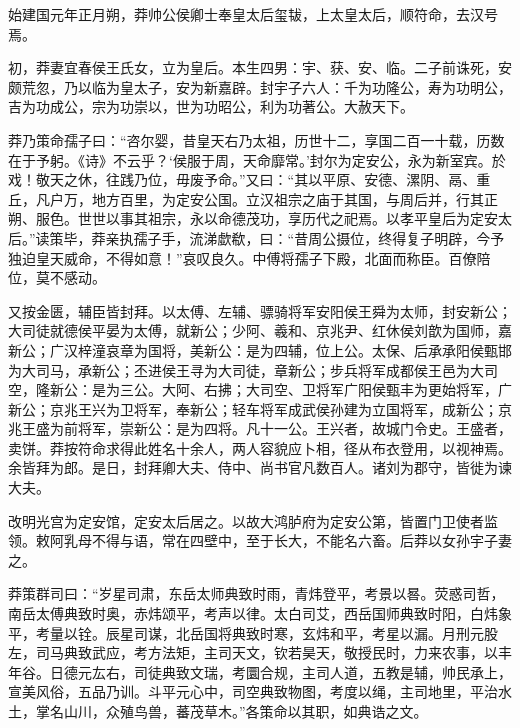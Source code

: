 \documentclass[12pt,UTF8]{ctexbook}
\begin{document}
始建国元年正月朔，莽帅公侯卿士奉皇太后玺韨，上太皇太后，顺符命，去汉号焉。



初，莽妻宜春侯王氏女，立为皇后。本生四男：宇、获、安、临。二子前诛死，安颇荒忽，乃以临为皇太子，安为新嘉辟。封宇子六人：千为功隆公，寿为功明公，吉为功成公，宗为功崇以，世为功昭公，利为功著公。大赦天下。



莽乃策命孺子曰：“咨尔婴，昔皇天右乃太祖，历世十二，享国二百一十载，历数在于予躬。《诗》不云乎？‘侯服于周，天命靡常。’封尔为定安公，永为新室宾。於戏！敬天之休，往践乃位，毋废予命。”又曰：“其以平原、安德、漯阴、鬲、重丘，凡户万，地方百里，为定安公国。立汉祖宗之庙于其国，与周后并，行其正朔、服色。世世以事其祖宗，永以命德茂功，享历代之祀焉。以孝平皇后为定安太后。”读策毕，莽亲执孺子手，流涕歔欷，曰：“昔周公摄位，终得复子明辟，今予独迫皇天威命，不得如意！”哀叹良久。中傅将孺子下殿，北面而称臣。百僚陪位，莫不感动。



又按金匮，辅臣皆封拜。以太傅、左辅、骠骑将军安阳侯王舜为太师，封安新公；大司徒就德侯平晏为太傅，就新公；少阿、羲和、京兆尹、红休侯刘歆为国师，嘉新公；广汉梓潼哀章为国将，美新公：是为四辅，位上公。太保、后承承阳侯甄邯为大司马，承新公；丕进侯王寻为大司徒，章新公；步兵将军成都侯王邑为大司空，隆新公：是为三公。大阿、右拂；大司空、卫将军广阳侯甄丰为更始将军，广新公；京兆王兴为卫将军，奉新公；轻车将军成武侯孙建为立国将军，成新公；京兆王盛为前将军，崇新公：是为四将。凡十一公。王兴者，故城门令史。王盛者，卖饼。莽按符命求得此姓名十余人，两人容貌应卜相，径从布衣登用，以视神焉。余皆拜为郎。是日，封拜卿大夫、侍中、尚书官凡数百人。诸刘为郡守，皆徙为谏大夫。



改明光宫为定安馆，定安太后居之。以故大鸿胪府为定安公第，皆置门卫使者监领。敕阿乳母不得与语，常在四壁中，至于长大，不能名六畜。后莽以女孙宇子妻之。



莽策群司曰：“岁星司肃，东岳太师典致时雨，青炜登平，考景以晷。荧惑司哲，南岳太傅典致时奥，赤炜颂平，考声以律。太白司艾，西岳国师典致时阳，白炜象平，考量以铨。辰星司谋，北岳国将典致时寒，玄炜和平，考星以漏。月刑元股左，司马典致武应，考方法矩，主司天文，钦若昊天，敬授民时，力来农事，以丰年谷。日德元厷右，司徒典致文瑞，考圜合规，主司人道，五教是辅，帅民承上，宣美风俗，五品乃训。斗平元心中，司空典致物图，考度以绳，主司地里，平治水土，掌名山川，众殖鸟兽，蕃茂草木。”各策命以其职，如典诰之文。
\end{document}
